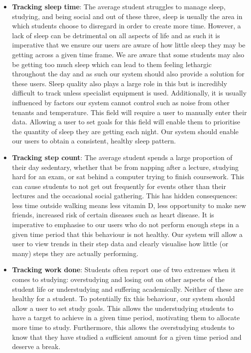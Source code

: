 \documentclass[11pt]{article}
\begin{document}
\begin{itemize}

    \item \textbf{Tracking sleep time}: The average student struggles to manage
        sleep, studying, and being social and out of these three, sleep is
        usually the area in which students choose to disregard in order to
        create more time. However, a lack of sleep can be detrimental on all
        aspects of life and as such it is imperative that we ensure our users
        are aware of how little sleep they may be getting across a given time
        frame. We are aware that some students may also be getting too much
        sleep which can lead to them feeling lethargic throughout the day and
        as such our system should also provide a solution for these users.
        Sleep quality also plays a large role in this but is incredibly
        difficult to track unless specialist equipment is used. Additionally,
        it is usually influenced by factors our system cannot control such as
        noise from other tenants and temperature. This field will require a
        user to manually enter their data. Allowing a user to set goals for
        this field will enable them to prioritise the quantity of sleep they
        are getting each night. Our system should enable our users to obtain a
        consistent, healthy sleep pattern.

    \newpage
    
    \item \textbf{Tracking step count}: The average student spends a large
        proportion of their day sedentary, whether that be from napping after a
        lecture, studying hard for an exam, or sat behind a computer trying to
        finish coursework. This can cause students to not get out frequently
        for events other than their lectures and the occasional social
        gathering. This has hidden consequences: less time outside walking
        means less vitamin D, less opportunity to make new friends, increased
        risk of certain diseases such as heart disease. It is imperative to
        emphasise to our users who do not perform enough steps in a given time
        period that this behaviour is not healthy. Our system will allow a user
        to view trends in their step data and clearly visualise how little (or
        many) steps they are actually performing.

    \item \textbf{Tracking work done}: Students often report one of two
        extremes when it comes to studying: overstudying and losing out on
        other aspects of the student life or understudying and suffering
        academically. Neither of these are healthy for a student. To
        potentially fix this behaviour, our system should allow a user to set
        study goals. This allows the understudying students to have a target to
        achieve in a given time period, motivating them to allocate more time
        to study. Furthermore, this allows the overstudying students to know
        that they have studied a sufficient amount for a given time period and
        deserve a break.
    

\end{itemize}
\end{document}
